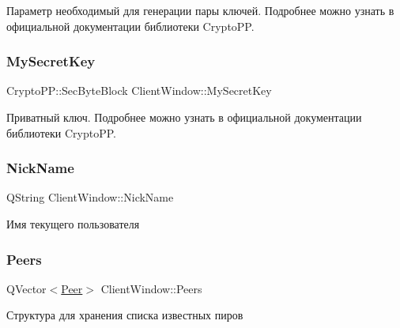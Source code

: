 Параметр необходимый для генерации пары ключей. Подробнее можно узнать в официальной документации библиотеки Crypto\+PP. 

\mbox{\label{class_client_window_a771a96af9209f03fab4db74ad343c280}} 
\subsubsection{\texorpdfstring{My\+Secret\+Key}{MySecretKey}}
{\footnotesize\ttfamily Crypto\+P\+P\+::\+Sec\+Byte\+Block Client\+Window\+::\+My\+Secret\+Key\hspace{0.3cm}{\ttfamily [private]}}



Приватный ключ. Подробнее можно узнать в официальной документации библиотеки Crypto\+PP. 

\mbox{\label{class_client_window_a0a1282c1054a3810a4c772db4ffde530}} 
\subsubsection{\texorpdfstring{Nick\+Name}{NickName}}
{\footnotesize\ttfamily Q\+String Client\+Window\+::\+Nick\+Name\hspace{0.3cm}{\ttfamily [private]}}



Имя текущего пользователя 

\mbox{\label{class_client_window_a8e6109e2659c78a3f959df0a450862ae}} 
\subsubsection{\texorpdfstring{Peers}{Peers}}
{\footnotesize\ttfamily Q\+Vector$<$\hyperlink{class_peer}{Peer}$>$ Client\+Window\+::\+Peers\hspace{0.3cm}{\ttfamily [private]}}



Структура для хранения списка известных пиров 

